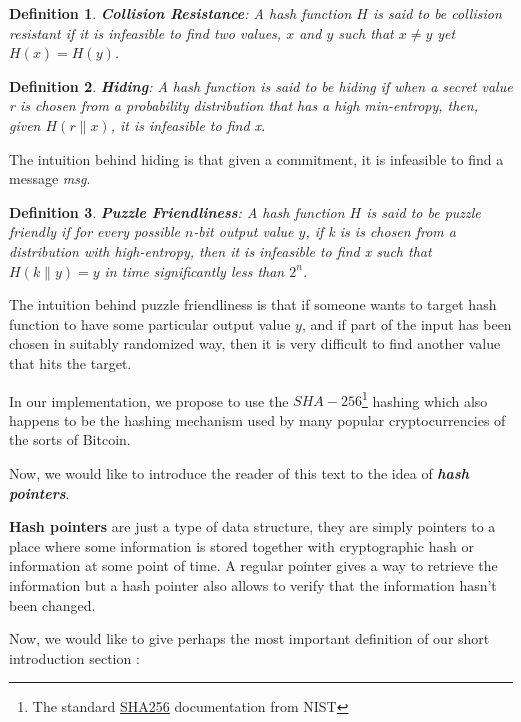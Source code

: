 \documentclass[a4paper, 12pt]{article}
\newtheorem{definition}{Definition}
\begin{document}
\begin{definition}
    \textbf{Collision Resistance}: A hash function $H$ is said to be collision resistant if it is infeasible to find two values, $x$ and $y$ such that $x\neq y$ yet $H(x)=H(y)$. 
\end{definition}

\begin{definition}
    \textbf{Hiding}: A hash function is said to be \emph{hiding} if when a secret value r is chosen from a probability distribution that has a high min-entropy, then, given $H(r\parallel x)$, it is infeasible to find x. 
\end{definition}

The intuition behind hiding is that given a commitment, it is infeasible to find a message \emph{msg}. 

\begin{definition}
    \textbf{Puzzle Friendliness}: A hash function $H$ is said to be puzzle friendly if for every possible $n$-bit output value
    $y$, if k is is chosen from a distribution with high-entropy, then it is infeasible to find x such that $H(k\parallel y)=y$ in time significantly less than $2^{n}$.  
\end{definition}

The intuition behind puzzle friendliness is that if someone wants to target hash function to have some particular output value $y$, and if part of the input has been chosen in suitably randomized way, then it is very difficult to find another value that hits the target.

In our implementation, we propose to use the $SHA-256$\footnote{\label{sha256} The standard \href{https://csrc.nist.gov/csrc/media/publications/fips/180/4/final/documents/fips180-4-draft-aug2014.pdf}{SHA256} documentation from NIST} hashing which also happens to be the hashing mechanism used by many popular cryptocurrencies of the sorts of Bitcoin. 

Now, we would like to introduce the reader of this text to the idea of \textbf{\emph{hash pointers}}. 

\textbf{Hash pointers} are just a type of data structure, they are simply pointers to a place where some information is stored together with cryptographic hash or information at some point of time. A regular pointer gives a way to retrieve the information but a hash pointer also allows to verify that the information hasn't been changed. 

Now, we would like to give perhaps the most important definition of our short introduction section : 
\end{document}
